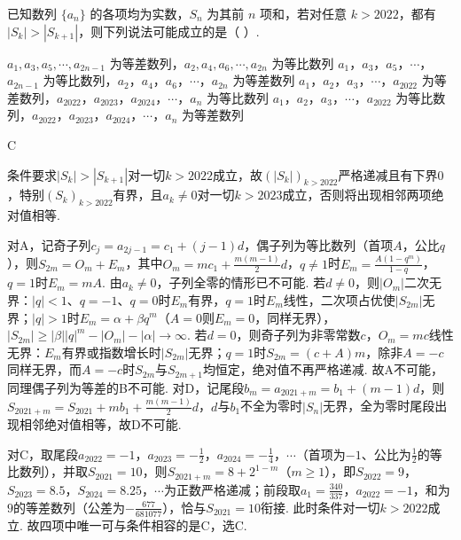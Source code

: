 \begin{problem}
已知数列 \(\{a_n\}\) 的各项均为实数，\(S_n\) 为其前 \(n\) 项和，若对任意 \(k>2022\)，都有 \(\left|S_k\right|>\left|S_{k+1}\right|\)，则下列说法可能成立的是（ \quad ）.

\choices
    {\(a_1,a_3,a_5,\cdots,a_{2n-1}\) 为等差数列，\(a_2,a_4,a_6,\cdots,a_{2n}\) 为等比数列}
    {\(a_1\)，\(a_3\)，\(a_5\)，\(\cdots\)，\(a_{2n-1}\) 为等比数列，\(a_2\)，\(a_4\)，\(a_6\)，\(\cdots\)，\(a_{2n}\) 为等差数列}
    {\(a_1\)，\(a_2\)，\(a_3\)，\(\cdots\)，\(a_{2022}\) 为等差数列，\(a_{2022}\)，\(a_{2023}\)，\(a_{2024}\)，\(\cdots\)，\(a_n\) 为等比数列}
    {\(a_1\)，\(a_2\)，\(a_3\)，\(\cdots\)，\(a_{2022}\) 为等比数列，\(a_{2022}\)，\(a_{2023}\)，\(a_{2024}\)，\(\cdots\)，\(a_n\) 为等差数列}
\end{problem}

\begin{answer}
C
\end{answer}

\begin{solution}
条件要求\(\left|S_k\right|>\left|S_{k+1}\right|\)对一切\(k>2022\)成立，故\(\left(\left|S_k\right|\right)_{k>2022}\)严格递减且有下界\(0\)，特别\(\left(S_k\right)_{k>2022}\)有界，且\(a_k\ne 0\)对一切\(k>2023\)成立，否则将出现相邻两项绝对值相等.

对A，记奇子列\(c_j=a_{2j-1}=c_1+\left(j-1\right)d\)，偶子列为等比数列（首项\(A\)，公比\(q\)），则\(S_{2m}=O_m+E_m\)，其中\(O_m=mc_1+\frac{m\left(m-1\right)}{2}d\)，\(q\ne 1\)时\(E_m=\frac{A\left(1-q^m\right)}{1-q}\)，\(q=1\)时\(E_m=mA\). 由\(a_k\ne 0\)，子列全零的情形已不可能. 若\(d\ne 0\)，则\(\left|O_m\right|\)二次无界：\(\left|q\right|<1\)、\(q=-1\)、\(q=0\)时\(E_m\)有界，\(q=1\)时\(E_m\)线性，二次项占优使\(\left|S_{2m}\right|\)无界；\(\left|q\right|>1\)时\(E_m=\alpha+\beta q^m\)（\(A=0\)则\(E_m=0\)，同样无界），\(\left|S_{2m}\right|\ge \left|\beta\right|\left|q\right|^m-\left|O_m\right|-\left|\alpha\right|\to\infty\). 若\(d=0\)，则奇子列为非零常数\(c\)，\(O_m=mc\)线性无界：\(E_m\)有界或指数增长时\(\left|S_{2m}\right|\)无界；\(q=1\)时\(S_{2m}=\left(c+A\right)m\)，除非\(A=-c\)同样无界，而\(A=-c\)时\(S_{2m}\)与\(S_{2m+1}\)均恒定，绝对值不再严格递减. 故A不可能，同理偶子列为等差的B不可能. 对D，记尾段\(b_m=a_{2021+m}=b_1+\left(m-1\right)d\)，则\(S_{2021+m}=S_{2021}+mb_1+\frac{m\left(m-1\right)}{2}d\)，\(d\)与\(b_1\)不全为零时\(\left|S_n\right|\)无界，全为零时尾段出现相邻绝对值相等，故D不可能.

对C，取尾段\(a_{2022}=-1\)，\(a_{2023}=-\frac12\)，\(a_{2024}=-\frac14\)，\(\cdots\)（首项为\(-1\)、公比为\(\frac12\)的等比数列），并取\(S_{2021}=10\)，则\(S_{2021+m}=8+2^{1-m}\)（\(m\ge 1\)），即\(S_{2022}=9\)，\(S_{2023}=8.5\)，\(S_{2024}=8.25\)，\(\cdots\)为正数严格递减；前段取\(a_1=\frac{340}{337}\)，\(a_{2022}=-1\)，和为\(9\)的等差数列（公差为\(-\frac{677}{681077}\)），恰与\(S_{2021}=10\)衔接. 此时条件对一切\(k>2022\)成立. 故四项中唯一可与条件相容的是C，选C.
\end{solution}
